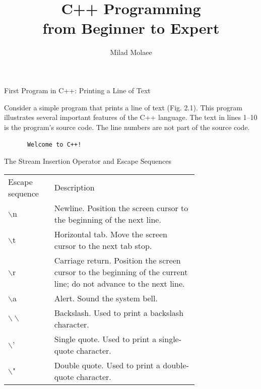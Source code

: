 \documentclass[11pt]{beamer}
\author[miladmolaee@hotmail.com]{\large Milad Molaee}
\title[C++ Programming]{C++ Programming\\\vspace{5pt}from Beginner to Expert\\\vspace{20pt}{\color{darkblue}\large Chapter 2 : Introduction to C++ Programming, Input/Output and Operators}}
\begin{document}
 
%
\frame{\titlepage}

%

\begin{frame}{\small First Program in C++: Printing a Line of Text}
	
	Consider a simple program that prints a line of text (Fig. 2.1). This program illustrates several important features of the C++ language. The text in lines 1–10 is the program’s source code. The line numbers are not part of the source code.
	
	
	
	\begin{block}{\textcolor{white}{output}}
		\texttt{\small Welcome to C++!}
	\end{block}
	
\end{frame}


\begin{frame}{\small The Stream Insertion Operator and Escape Sequences}
	\centering\tiny\renewcommand{\arraystretch}{2}	
\begin{tabular}{p{0.15\linewidth} p{0.6\linewidth}}
	
	\rowcolor{cyan}\color{white} Escape sequence & \color{white} Description \\
	
	\rowcolor{lightcyan} $\backslash$n & Newline. Position the screen cursor to the beginning of the next line.\\ 
	
	\rowcolor{lightcyan} $\backslash$t & Horizontal tab. Move the screen cursor to the next tab stop.\\ 
	
	\rowcolor{lightcyan} $\backslash$r & Carriage return. Position the screen cursor to the beginning of the current line; do not advance to the next line.\\ 
	
	\rowcolor{lightcyan} $\backslash$a & Alert. Sound the system bell.\\ 
	
	\rowcolor{lightcyan} $\backslash\backslash$ & Backslash. Used to print a backslash character.\\ 
	
	\rowcolor{lightcyan} $\backslash$' & Single quote. Used to print a single-quote character.\\ 
	
	\rowcolor{lightcyan} $\backslash$" & Double quote. Used to print a double-quote character.
\end{tabular}
\end{frame}
\end{document}
